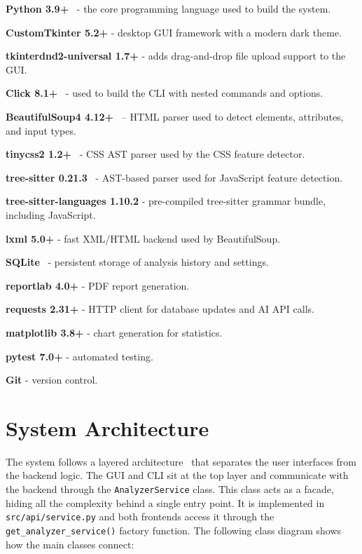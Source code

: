 \begin{compactitem}
    \item \textbf{Python 3.9+}~\cite{python39} - the core programming language used to build the system.
    \item \textbf{CustomTkinter 5.2+} - desktop GUI framework with a modern dark theme.
    \item \textbf{tkinterdnd2-universal 1.7+} - adds drag-and-drop file upload support to the GUI.
    \item \textbf{Click 8.1+}~\cite{clickdocs} - used to build the CLI with nested commands and options.
    \item \textbf{BeautifulSoup4 4.12+}~\cite{bs4docs} -- HTML parser used to detect elements, attributes, and input types.
    \item \textbf{tinycss2 1.2+}~\cite{tinycss2} - CSS AST parser used by the CSS feature detector.
    \item \textbf{tree-sitter 0.21.3}~\cite{treesitter} - AST-based parser used for JavaScript feature detection.
    \item \textbf{tree-sitter-languages 1.10.2} - pre-compiled tree-sitter grammar bundle, including JavaScript.
    \item \textbf{lxml 5.0+} - fast XML/HTML backend used by BeautifulSoup.
    \item \textbf{SQLite}~\cite{sqlitedocs} - persistent storage of analysis history and settings.
    \item \textbf{reportlab 4.0+} - PDF report generation.
    \item \textbf{requests 2.31+} - HTTP client for database updates and AI API calls.
    \item \textbf{matplotlib 3.8+} - chart generation for statistics.
    \item \textbf{pytest 7.0+} - automated testing.
    \item \textbf{Git} - version control.
\end{compactitem}


\newpage
\section{System Architecture}
\label{sec:architecture}

The system follows a layered architecture~\cite{martin2017cleanarch} that separates the user interfaces from the backend logic. The GUI and CLI sit at the top layer and communicate with the backend through the \texttt{AnalyzerService} class. This class acts as a facade, hiding all the complexity behind a single entry point. It is implemented in \texttt{src/api/service.py} and both frontends access it through the \texttt{get\_analyzer\_service()} factory function. The following class diagram shows how the main classes connect:

